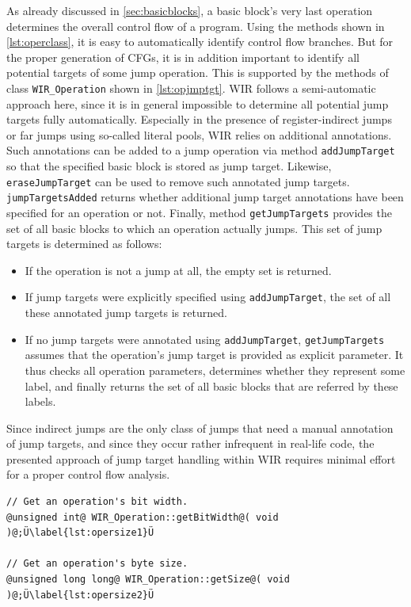 As already discussed in \cref{sec:basicblocks}, a basic block's very last operation determines the overall control flow of a program.
Using the methods shown in \cref{lst:operclass}, it is easy to automatically identify control flow branches.
But for the proper generation of \glspl{CFG}, it is in addition important to identify all potential targets of some jump operation.
This is supported by the methods of class \texttt{WIR\_Operation} shown in \cref{lst:opjmptgt}.
\gls{WIR} follows a semi-automatic approach here, since it is in general impossible to determine all potential jump targets fully automatically.
Especially in the presence of register-indirect jumps or far jumps using so-called literal pools, \gls{WIR} relies on additional annotations.
Such annotations can be added to a jump operation via method \texttt{addJumpTarget} so that the specified basic block is stored as jump target.
Likewise, \texttt{eraseJumpTarget} can be used to remove such annotated jump targets.
\texttt{jumpTargetsAdded} returns whether additional jump target annotations have been specified for an operation or not.
Finally, method \texttt{getJumpTargets} provides the set of all basic blocks to which an operation actually jumps.
This set of jump targets is determined as follows:
\begin{itemize}
  \item If the operation is not a jump at all, the empty set is returned.
  \item If jump targets were explicitly specified using \texttt{addJumpTarget},
        the set of all these annotated jump targets is returned.
  \item If no jump targets were annotated using \texttt{addJumpTarget},
        \texttt{getJumpTargets} assumes that the operation's jump target is
        provided as explicit parameter. It thus checks all operation parameters,
        determines whether they represent some label, and finally returns the
        set of all basic blocks that are referred by these labels.
\end{itemize}

Since indirect jumps are the only class of jumps that need a manual annotation of jump targets, and since they occur rather infrequent in real-life code, the presented approach of jump target handling within \gls{WIR} requires minimal effort for a proper control flow analysis.

\begin{lstlisting}[style=code,float=t,caption={Size Computation by Class \texttt{WIR\_Operation}},label=lst:opersize]
// Get an operation's bit width.
@unsigned int@ WIR_Operation::getBitWidth@( void )@;Ü\label{lst:opersize1}Ü

// Get an operation's byte size.
@unsigned long long@ WIR_Operation::getSize@( void )@;Ü\label{lst:opersize2}Ü
\end{lstlisting}

